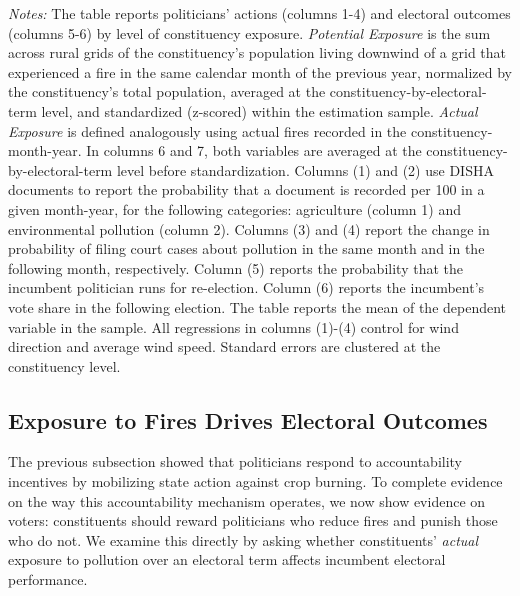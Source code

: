 \documentclass[12pt]{article}
\begin{document}
\begin{table}[htbp!] 
\caption{Pollution Exposure, Politicians' Actions, and Electoral Consequences, rural grid $\times$ Any Fire $\times$ Downwind Population}\label{tab:mechanism}
        \resizebox{\linewidth}{!}{
        
        }
    \begin{minipage}{\textwidth}
        {\footnotesize \textit{Notes:} The table reports politicians' actions (columns 1-4) and electoral outcomes (columns 5-6) by level of constituency exposure.
        \textit{Potential Exposure} is the sum across rural grids of the constituency's population living downwind of a grid that experienced a fire in the same calendar month of the previous year, normalized by the constituency's total population, averaged at the constituency-by-electoral-term level, and standardized (z-scored) within the estimation sample.
        \textit{Actual Exposure} is defined analogously using actual fires recorded in the   constituency-month-year. In columns 6 and 7, both variables are averaged at  the constituency-by-electoral-term level before standardization.
        Columns (1) and (2) use DISHA documents to report the probability that a document is recorded per 100 in a given month-year, for the following categories: agriculture (column 1) and environmental pollution (column 2). Columns (3) and (4) report the change in probability of filing court cases about pollution in the same month and in the following month, respectively. Column (5) reports the probability that the incumbent politician runs for re-election. Column (6) reports the incumbent's vote share in the following election.
        The table reports the mean of the dependent variable in the sample. All regressions in columns (1)-(4) control for wind direction and average wind speed. Standard errors are clustered at the constituency level.
        }
    \end{minipage}
\end{table}


\subsection{Exposure to Fires Drives Electoral Outcomes}

The previous subsection showed that politicians respond to accountability incentives by mobilizing state action against crop burning. To complete evidence on the way this accountability mechanism operates, we now show evidence on voters: constituents should reward politicians who reduce fires and punish those who do not. We examine this directly by asking whether constituents' \textit{actual} exposure to pollution over an electoral term affects incumbent electoral performance.
\end{document}
